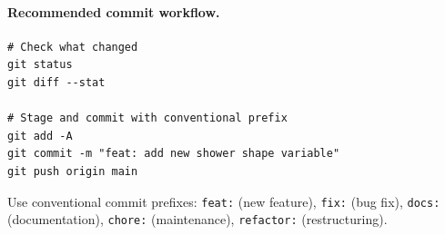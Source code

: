 \documentclass[12pt,a4paper]{article}
\begin{document}
\paragraph{Recommended commit workflow.}
\begin{lstlisting}
# Check what changed
git status
git diff --stat

# Stage and commit with conventional prefix
git add -A
git commit -m "feat: add new shower shape variable"
git push origin main
\end{lstlisting}

Use conventional commit prefixes: \texttt{feat:} (new feature),
\texttt{fix:} (bug fix), \texttt{docs:} (documentation),
\texttt{chore:} (maintenance), \texttt{refactor:} (restructuring).
\end{document}
